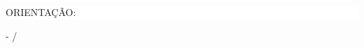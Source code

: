 \begin{center}
	\vskip 2cm
	
	\colorbox{white}{\begin{minipage}[t][2.6cm][t]{\textwidth}
			\begin{center}
				{\fontsize{16pt}{16pt}\selectfont \MakeUppercase{\tituloTRAB}}
			\end{center}
	\end{minipage}}

	\vskip 1.2cm

	\colorbox{white}{\begin{minipage}[t][1.6cm][t]{\textwidth}
		\begin{center}
			{\fontsize{12pt}{12pt}\selectfont \MakeUppercase{\academicoUmTRAB \break \academicoDoisTRAB \break \academicoTresTRAB}}
		\end{center}
	\end{minipage}}

	\vskip 1cm

	\colorbox{white}{\begin{minipage}[t][1cm][t]{\textwidth}
		\begin{center}
			{\fontsize{12pt}{12pt}\selectfont \MakeUppercase{Orientação: {\titulcaoOrientadorTRAB} {\nomeOrientadorTRAB}}}
		\end{center}
	\end{minipage}}
	
\vspace*{\fill}

{\fontsize{12pt}{12pt}\selectfont \MakeUppercase{{\cidadeTRAB } - {\siglaEstadoTRAB}}}
\break
{\fontsize{12pt}{12pt}\selectfont \MakeUppercase{\mesTRAB/\anoTRAB}}

\end{center}
\clearpage
\thispagestyle{empty}
\newpage


